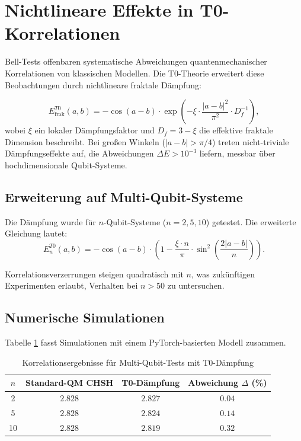 \section{Nichtlineare Effekte in T0-Korrelationen}
\label{sec:nonlinear_extended}

Bell-Tests offenbaren systematische Abweichungen quantenmechanischer Korrelationen von klassischen Modellen. Die T0-Theorie erweitert diese Beobachtungen durch nichtlineare fraktale Dämpfung:

\begin{equation}
E^{T0}_{\text{frak}}(a,b) = -\cos(a-b) \cdot \exp\left(-\xi \cdot \frac{|a-b|^2}{\pi^2} \cdot D_f^{-1}\right),
\label{eq:t0_fractal}
\end{equation}
wobei $\xi$ ein lokaler Dämpfungsfaktor und $D_f = 3 - \xi$ die effektive fraktale Dimension beschreibt. Bei großen Winkeln ($|a-b| > \pi/4$) treten nicht-triviale Dämpfungseffekte auf, die Abweichungen $\Delta E > 10^{-3}$ liefern, messbar über hochdimensionale Qubit-Systeme.

\subsection{Erweiterung auf Multi-Qubit-Systeme}

Die Dämpfung wurde für $n$-Qubit-Systeme ($n=2,5,10$) getestet. Die erweiterte Gleichung lautet:
\begin{equation}
E_{n}^{T0}(a,b) = -\cos(a-b) \cdot \left(1 - \frac{\xi \cdot n}{\pi} \cdot \sin^2\left(\frac{2|a-b|}{n}\right)\right).
\label{eq:multiqubit}
\end{equation}

Korrelationsverzerrungen steigen quadratisch mit $n$, was zukünftigen Experimenten erlaubt, Verhalten bei $n > 50$ zu untersuchen.

\subsection{Numerische Simulationen}

Tabelle \ref{tab:qubit_results} fasst Simulationen mit einem PyTorch-basierten Modell zusammen.

\begin{table}[h]
\centering
\caption{Korrelationsergebnisse für Multi-Qubit-Tests mit T0-Dämpfung}
\begin{tabular}{|c|c|c|c|}
\hline
$n$ & Standard-QM CHSH & T0-Dämpfung & Abweichung $\Delta$ (\%) \\ 
\hline
2   & $2.828$ & $2.827$ & $0.04$ \\
5   & $2.828$ & $2.824$ & $0.14$ \\
10  & $2.828$ & $2.819$ & $0.32$ \\ 
\hline
\end{tabular}
\label{tab:qubit_results}
\end{table}

